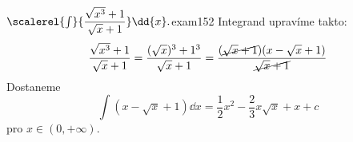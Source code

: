 \begin{mathexam}{\(\scalerel{\int}{\dfrac{\sqrt{x^3}+1}{\sqrt{x}+1}}\dd{x}.\)}{exam152} 
  Integrand upravíme takto: 
  \begin{equation*}
    \dfrac{\sqrt{x^3}+1}{\sqrt{x}+1} = \dfrac{(\sqrt{x})^3+1^3}{\sqrt{x}+1}
      = \dfrac{(\cancel{\sqrt{x} + 1})(x-\sqrt{x}+1)}{\cancel{\sqrt{x}+1}}
  \end{equation*}
  Dostaneme
  \[\int(x-\sqrt{x}+1)\dd{x} = \dfrac{1}{2}x^2 - \dfrac{2}{3}x\sqrt{x} + x +c\] pro
  \(x\in(0,+\infty)\). 
\end{mathexam}
